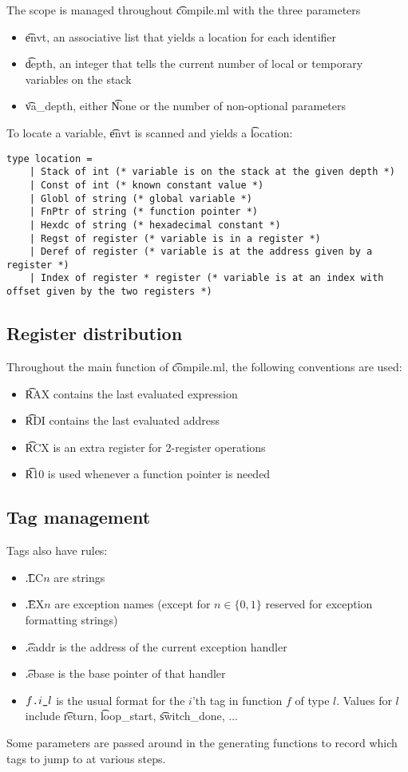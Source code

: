 The scope is managed throughout \t{compile.ml} with the three parameters
\begin{itemize}
    \item \t{envt}, an associative list that yields a location for each identifier
    \item \t{depth}, an integer that tells the current number of local or temporary variables on the stack
    \item \t{va\_depth}, either \t{None} or the number of non-optional parameters
\end{itemize}

To locate a variable, \t{envt} is scanned and yields a \t{location}:
\begin{verbatim}
type location =
    | Stack of int (* variable is on the stack at the given depth *)
    | Const of int (* known constant value *)
    | Globl of string (* global variable *)
    | FnPtr of string (* function pointer *)
    | Hexdc of string (* hexadecimal constant *)
    | Regst of register (* variable is in a register *)
    | Deref of register (* variable is at the address given by a register *)
    | Index of register * register (* variable is at an index with offset given by the two registers *)
\end{verbatim}

\subsection{Register distribution}

Throughout the main function of \t{compile.ml}, the following conventions are used:
\begin{itemize}
    \item \t{RAX} contains the last evaluated expression
    \item \t{RDI} contains the last evaluated address
    \item \t{RCX} is an extra register for 2-register operations
    \item \t{R10} is used whenever a function pointer is needed
\end{itemize}

\subsection{Tag management}
Tags also have rules:
\begin{itemize}
    \item \t{.LC}\(n\) are strings
    \item \t{.EX}\(n\) are exception names (except for \(n\in \{ 0, 1 \}\) reserved for exception formatting strings)
    \item \t{.eaddr} is the address of the current exception handler
    \item \t{.ebase} is the base pointer of that handler
    \item \(f\texttt{.}i\texttt{\_}l\) is the usual format for the \(i\)'th tag in function \(f\) of type \(l\). Values for \(l\) include \t{return}, \t{loop\_start}, \t{switch\_done}, ...
\end{itemize}

Some parameters are passed around in the generating functions to record which tags to jump to at various steps.
